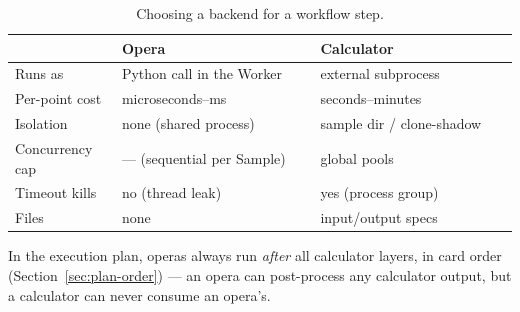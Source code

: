 \begin{table}[ht]
  \footnotesize
  \begingroup
  \setlength{\tabcolsep}{0pt}
  \begin{tabular}{@{}p{0.213\linewidth}p{0.394\linewidth}p{0.393\linewidth}@{}}
    \toprule
    & \textbf{Opera} & \textbf{Calculator} \\
    \midrule
    Runs as          & Python call in the Worker & external subprocess \\
    Per-point cost   & microseconds--ms          & seconds--minutes \\
    Isolation        & none (shared process)     & sample dir / clone-shadow \\
    Concurrency cap  & --- (sequential per Sample) & global pools \\
    Timeout kills    & no (thread leak)          & yes (process group) \\
    Files            & none                      & input/output specs \\
    \bottomrule
  \end{tabular}
  \endgroup
  \caption{Choosing a backend for a workflow step.}
  \label{tab:opera-vs-calc}
\end{table}

In the execution plan, operas always run \emph{after} all calculator layers, in card
order (Section~\ref{sec:plan-order}) --- an opera can post-process any calculator
output, but a calculator can never consume an opera's.

